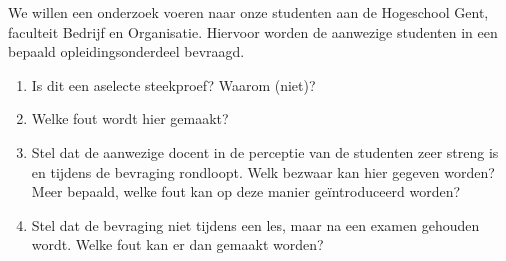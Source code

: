 \begin{exercise}
  We willen een onderzoek voeren naar onze studenten aan de Hogeschool Gent, faculteit Bedrijf en Organisatie. Hiervoor worden de aanwezige studenten in een bepaald opleidingsonderdeel bevraagd.
  
  \begin{enumerate}[label=\alph*.]
    \item Is dit een aselecte steekproef? Waarom (niet)?
    \item Welke fout wordt hier gemaakt?
    \item Stel dat de aanwezige docent in de perceptie van de studenten zeer streng is en tijdens de bevraging rondloopt. Welk bezwaar kan hier gegeven worden? Meer bepaald, welke fout kan op deze manier geïntroduceerd worden?
    \item Stel dat de bevraging niet tijdens een les, maar na een examen gehouden wordt. Welke fout kan er dan gemaakt worden?
  \end{enumerate}
\end{exercise}

